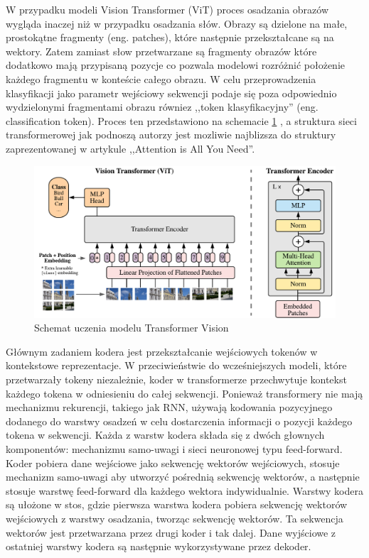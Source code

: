 \documentclass[12pt,a4paper,twoside]{book} %
\begin{document}
W przypadku modeli Vision Transformer (ViT) proces osadzania obrazów wygląda inaczej niż w przypadku osadzania słów.
Obrazy są dzielone na małe, prostokątne fragmenty (eng. patches), które następnie przekształcane są na wektory.
Zatem zamiast słow przetwarzane są fragmenty obrazów które dodatkowo mają przypisaną pozycje co pozwala modelowi rozróżnić położenie każdego fragmentu w konteście całego obrazu.
W celu przeprowadzenia klasyfikacji jako parametr wejściowy sekwencji podaje się poza odpowiednio wydzielonymi fragmentami obrazu równiez ,,token klasyfikacyjny'' (eng. classification token).
Proces ten przedstawiono na schemacie \ref{fig:vit_scheme} \cite{DBLP:journals/corr/abs-2010-11929}, a struktura sieci transformerowej jak podnoszą autorzy jest mozliwie najblizsza do struktury zaprezentowanej w artykule ,,Attention is All You Need''.

\begin{figure}[H]
    \centering
	\includegraphics[scale=0.50]{figs/vit_scheme.pdf}
	\caption{Schemat uczenia modelu Transformer Vision}
	\label{fig:vit_scheme}
\end{figure}

Głównym zadaniem kodera jest przekształcanie wejściowych tokenów w kontekstowe reprezentacje. 
W przeciwieństwie do wcześniejszych modeli, które przetwarzały tokeny niezależnie, koder w transformerze przechwytuje kontekst każdego tokena w odniesieniu do całej sekwencji.
Ponieważ transformery nie mają mechanizmu rekurencji, takiego jak RNN, używają kodowania pozycyjnego dodanego do warstwy osadzeń w celu dostarczenia informacji o pozycji każdego tokena w sekwencji.
Każda z warstw kodera składa się z dwóch głownych komponentów: mechanizmu samo-uwagi i sieci neuronowej typu feed-forward. 
Koder pobiera dane wejściowe jako sekwencję wektorów wejściowych, stosuje mechanizm samo-uwagi aby utworzyć pośrednią sekwencję wektorów, a następnie stosuje warstwę feed-forward dla każdego wektora indywidualnie.
Warstwy kodera są ułożone w stos, gdzie pierwsza warstwa kodera pobiera sekwencję wektorów wejściowych z warstwy osadzania, tworząc sekwencję wektorów. 
Ta sekwencja wektorów jest przetwarzana przez drugi koder i tak dalej. 
Dane wyjściowe z ostatniej warstwy kodera są następnie wykorzystywane przez dekoder.
\end{document}

